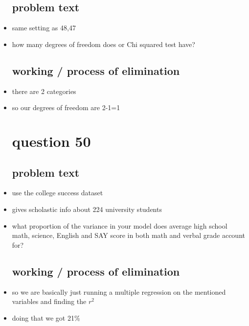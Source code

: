 \documentclass{article}
\begin{document}
\begin{itemize}
\subsection{problem text}
\item same setting as 48,47
\item how many degrees of freedom does or Chi squared test have?
\subsection{working / process of elimination }
\item there are 2 categories 
\item so our degrees of freedom are 2-1=1



\section{question 50}
\subsection{problem text}
\item use the college success dataset 
\item gives scholastic info about 224 university students 
\item what proportion of the variance in your model does average high school math, science, English and SAY score in both math and verbal grade account for? 
\subsection{working / process of elimination }
\item so we are basically just running a multiple regression on the mentioned variables and finding the $r^2$
\item doing that we got 21\%

\end{itemize}
\end{document}
